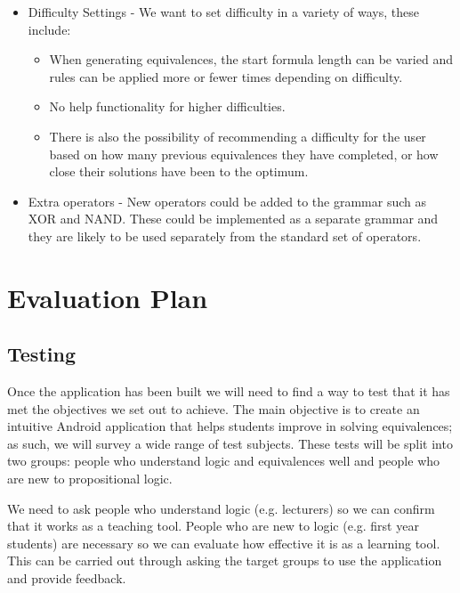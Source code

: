\documentclass{report}
\begin{document}
\begin{enumerate}
\begin{itemize}
\item Difficulty Settings - We want to set difficulty in a variety of ways, these include:

\begin{itemize}
\item When generating equivalences, the start formula length can be varied and rules can be applied more or fewer times depending on difficulty.
\item No help functionality for higher difficulties.
\item There is also the possibility of recommending a difficulty for the user based on how many previous equivalences they have completed, or how close their solutions have been to the optimum.
\end{itemize}

\item Extra operators - New operators could be added to the grammar such as XOR and NAND. These could be implemented as a separate grammar and they are likely to be used separately from the standard set of operators.
\end{itemize}

\end{enumerate}

\chapter{Evaluation Plan}

\section{Testing}

Once the application has been built we will need to find a way to test that it has met the objectives we set out to achieve. The main objective is to create an intuitive Android application that helps students improve in solving equivalences; as such, we will survey a wide range of test subjects. These tests will be split into two groups: people who understand logic and equivalences well and people who are new to propositional logic.

We need to ask people who understand logic (e.g. lecturers) so we can confirm that it works as a teaching tool. People who are new to logic (e.g. first year students) are necessary so we can evaluate how effective it is as a learning tool. This can be carried out through asking the target groups to use the application and provide feedback.
\end{document}
